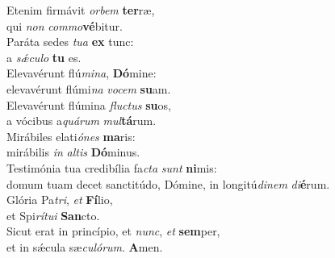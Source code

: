 \evenverse Etenim firmávit \textit{or}\textit{bem} \textbf{ter}ræ,~\*\\
\evenverse qui \textit{non} \textit{com}\textit{mo}\textbf{vé}bitur.\\
\oddverse Paráta sedes \textit{tu}\textit{a} \textbf{ex} tunc:~\*\\
\oddverse a \textit{sǽ}\textit{cu}\textit{lo} \textbf{tu} es.\\
\evenverse Elevavérunt flú\textit{mi}\textit{na}, \textbf{Dó}mine:~\*\\
\evenverse elevavérunt flúmi\textit{na} \textit{vo}\textit{cem} \textbf{su}am.\\
\oddverse Elevavérunt flúmina \textit{flu}\textit{ctus} \textbf{su}os,~\*\\
\oddverse a vócibus a\textit{quá}\textit{rum} \textit{mul}\textbf{tá}rum.\\
\evenverse Mirábiles elati\textit{ó}\textit{nes} \textbf{ma}ris:~\*\\
\evenverse mirábilis \textit{in} \textit{al}\textit{tis} \textbf{Dó}minus.\\
\oddverse Testimónia tua credibília fa\textit{cta} \textit{sunt} \textbf{ni}mis:~\*\\
\oddverse domum tuam decet sanctitúdo, Dómine, in longitú\textit{di}\textit{nem} \textit{di}\textbf{é}rum.\\
\evenverse Glória Pa\textit{tri}, \textit{et} \textbf{Fí}lio,~\*\\
\evenverse et Spi\textit{rí}\textit{tu}\textit{i} \textbf{San}cto.\\
\oddverse Sicut erat in princípio, et \textit{nunc}, \textit{et} \textbf{sem}per,~\*\\
\oddverse et in sǽcula sæ\textit{cu}\textit{ló}\textit{rum}. \textbf{A}men.\\

